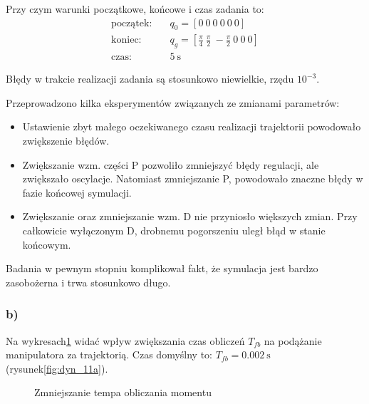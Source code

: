 \documentclass[11pt, a4paper]{article}
\begin{document}
Przy czym warunki początkowe, końcowe i czas zadania to:
\begin{align*}
\text{początek:} \quad & q_0 = \left[0 \ 0 \ 0 \ 0 \ 0 \ 0 \right] \\
\text{koniec:} \quad & q_g = \left[
	\frac{\pi}{4} \ \frac{\pi}{2} \ -\frac{\pi}{2} \ 0 \ 0 \ 0 \right] \\
\text{czas:} \quad & 5 \ \text{s}
\end{align*}

Błędy w trakcie realizacji zadania są stosunkowo niewielkie, rzędu $10^{-3}$.

Przeprowadzono kilka eksperymentów związanych ze zmianami parametrów:
\begin{itemize}
\item Ustawienie zbyt małego oczekiwanego czasu realizacji trajektorii powodowało zwiększenie błędów.
\item Zwiększanie wzm. części P pozwoliło zmniejszyć błędy regulacji, ale zwiększało oscylacje. Natomiast zmniejszanie P, powodowało znaczne błędy w fazie końcowej symulacji.
\item Zwiększanie oraz zmniejszanie wzm. D nie przyniosło większych zmian. Przy całkowicie wyłączonym D, drobnemu pogorszeniu uległ błąd w stanie końcowym.
\end{itemize}

Badania w pewnym stopniu komplikował fakt, że symulacja jest bardzo zasobożerna i trwa stosunkowo długo.

\subsubsection*{b)}


Na wykresach\ref{fig:dyn_11b} widać wpływ zwiększania czas obliczeń $T_{fb}$ na podążanie manipulatora za trajektorią. Czas domyślny to: $T_{fb} = 0.002 \ \text{s}$ (rysunek\ref{fig:dyn_11a}).
\begin{figure}[htbp!]
	\centering
	
	\hfill%
	\hfill%
	\hfill%

	\caption{Zmniejszanie tempa obliczania momentu \label{fig:dyn_11b}}
\end{figure}
\end{document}
